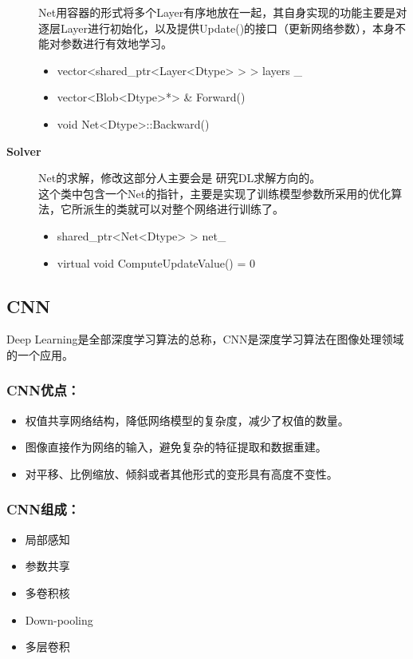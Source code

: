 \begin{description}
Net用容器的形式将多个Layer有序地放在一起，其自身实现的功能主要是对逐层Layer进行初始化，以及提供Update()的接口（更新网络参数），本身不能对参数进行有效地学习。
	\begin{itemize}
	\item vector<shared\_ptr<Layer<Dtype> > > layers \_
	\item vector<Blob<Dtype>*> \& Forward()
	\item void Net<Dtype>::Backward()
	\end{itemize}
\item[\textbf{Solver}] Net的求解，修改这部分人主要会是{\color{blue} 研究DL求解}方向的。\\
	这个类中包含一个Net的指针，主要是实现了训练模型参数所采用的优化算法，它所派生的类就可以对整个网络进行训练了。
	\begin{itemize}
	\item shared\_ptr<Net<Dtype> > net\_
	\item virtual void ComputeUpdateValue() = 0
	\end{itemize}
\end{description}

\subsection{CNN}
Deep Learning是全部深度学习算法的总称，CNN是深度学习算法在图像处理领域的一个应用。

\subsubsection{CNN优点：}
\begin{itemize}
\item 权值共享网络结构，降低网络模型的复杂度，减少了权值的数量。
\item 图像直接作为网络的输入，避免复杂的特征提取和数据重建。
\item 对平移、比例缩放、倾斜或者其他形式的变形具有高度不变性。
\end{itemize}

\subsubsection{CNN组成：}
\begin{itemize}
\item 局部感知
\item 参数共享
\item 多卷积核
\item Down-pooling
\item 多层卷积
\end{itemize}


